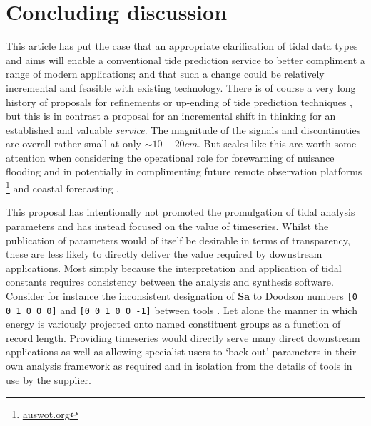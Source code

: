 \section{Concluding discussion}
\label{Sec:Discussion}
This article has put the case that an appropriate clarification of tidal data types and aims will enable a conventional tide prediction service to better compliment a range of modern applications; and that such a change could be relatively incremental and feasible with existing technology. 
There is of course a very long history of proposals for refinements or up-ending of tide prediction techniques \cite{Cartwright:2000tt}\cite{Jay:2003bj}, but this is in contrast a proposal for an incremental shift in thinking for an established and valuable \textit{service}.
The magnitude of the signals and discontinuties are overall rather small at only $\sim10-20cm$.   But scales like this are worth some attention when considering the operational role for forewarning of nuisance flooding \cite{Devlin:2017hu}\cite{10.1071/es19024} and in potentially in complimenting future remote observation platforms \footnote{\url{auswot.org}} and coastal forecasting \citep{10.3389/fmars.2019.00437}.

This proposal has intentionally not promoted the promulgation of tidal analysis parameters and has instead focused on the value of timeseries.   Whilst the publication of parameters would of itself be desirable in terms of transparency, these are less likely to directly deliver the value required by downstream applications.    Most simply because the interpretation and application of tidal constants requires consistency between the analysis and synthesis software. Consider for instance the inconsistent designation of \textbf{Sa} to Doodson numbers \texttt{[0 0 1 0 0 0]} and \texttt{[0 0 1 0 0 ‐1]} between tools \cite{PCTMSL-sp9}.  Let alone the manner in which energy is variously projected onto named constituent groups as a function of record length.  
Providing timeseries would directly serve many direct downstream applications as well as allowing specialist users to `back out' parameters in their own analysis framework as required and in isolation from the details of tools in use by the supplier.

